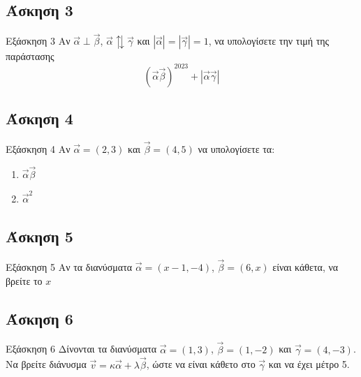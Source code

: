 \documentclass[greek]{beamer}
\begin{document}
\subsection{Άσκηση 3}
\begin{frame}[label=Άσκηση3,t]{Εξάσκηση 3}
      Αν $\vec{α}\perp\vec{β}$, $\vec{α}\updownarrows\vec{γ}$ και $|\vec{α}|=|\vec{γ}|=1$, να υπολογίσετε την τιμή της παράστασης
      $$(\vec{α}\vec{β})^{2023}+|\vec{α}\vec{γ}|$$
\end{frame}

\subsection{Άσκηση 4}
\begin{frame}[label=Άσκηση4,t]{Εξάσκηση 4}
      Αν $\vec{α}=(2,3)$ και $\vec{β}=(4,5)$ να υπολογίσετε τα:
      \begin{enumerate}
            \item<1-> $\vec{α}\vec{β}$
            \item<2-> $\vec{α}^2$
      \end{enumerate}
\end{frame}

\subsection{Άσκηση 5}
\begin{frame}[label=Άσκηση5,t]{Εξάσκηση 5}
      Αν τα διανύσματα $\vec{α}=(x-1,-4)$, $\vec{β}=(6,x)$ είναι κάθετα, να βρείτε το $x$

\end{frame}

\subsection{Άσκηση 6}
\begin{frame}[label=Άσκηση6,t]{Εξάσκηση 6}
      Δίνονται τα διανύσματα $\vec{α}=(1,3)$, $\vec{β}=(1,-2)$ και $\vec{γ}=(4,-3)$. Να βρείτε διάνυσμα $\vec{v}=κ\vec{α}+λ\vec{β}$, ώστε να είναι κάθετο στο $\vec{γ}$ και να έχει μέτρο 5.

\end{frame}
\end{document}

